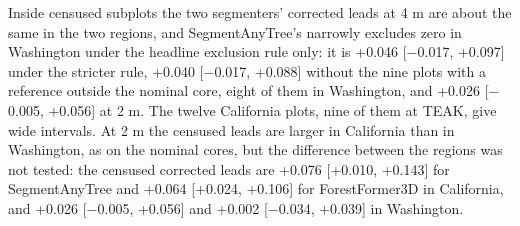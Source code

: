 \documentclass[10pt,a4paper]{article}
\begin{document}
Inside censused subplots the two segmenters' corrected leads at 4 m are about
the same in the two regions, and SegmentAnyTree's narrowly excludes zero in
Washington under the headline exclusion rule only: it is +0.046 [$-$0.017, +0.097]
under the stricter rule, +0.040 [$-$0.017, +0.088] without the nine plots with a
reference outside the nominal core, eight of them in Washington, and +0.026
[$-$0.005, +0.056] at 2 m. The twelve California plots, nine of them at TEAK, give
wide intervals. At 2 m the censused leads are larger in California than in
Washington, as on the nominal cores, but the difference between the regions was
not tested: the censused corrected leads are +0.076 [+0.010, +0.143] for
SegmentAnyTree and +0.064 [+0.024, +0.106] for ForestFormer3D in California, and
+0.026 [$-$0.005, +0.056] and +0.002 [$-$0.034, +0.039] in Washington.
\end{document}

